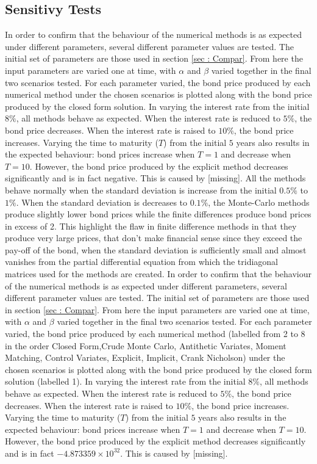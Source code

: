 \documentclass[12pt,a4paper]{article}
\begin{document}
\subsection{Sensitivy Tests}
In order to confirm that the behaviour of the numerical methods is as expected under different parameters, several different parameter values are tested. The initial set of parameters are those used in section \ref{sec : Compar}. From here the input parameters are varied one at time, with $\alpha$ and $\beta$ varied together in the final two scenarios tested. For each parameter varied, the bond price produced by each numerical method under the chosen scenarios is plotted along with the bond price produced by the closed form solution.
In varying the interest rate from the initial $8\%$, all methods behave as expected. When the interest rate is reduced to $5\%$, the bond price decreases. When the interest rate is raised to $10\%$, the bond price increases.	Varying the time to maturity ($T$) from the initial $5$ years also results in the expected behaviour: bond prices increase when $T=1$ and decrease when $T=10$. However, the bond price produced by the explicit method decreases significantly and is in fact negative. This is caused by [missing].
All the methods behave normally when the standard deviation is increase from the initial $0.5\%$ to $1\%$. When the standard deviation is decreases to $0.1\%$, the Monte-Carlo methods produce slightly lower bond prices while the finite differences produce bond prices in excess of 2. This highlight the flaw in finite difference methods in that they produce very large prices, that don't make financial sense since they exceed the pay-off of the bond, when the standard deviation is sufficiently small and almost vanishes from the partial differential equation from which the tridiagonal matrices used for the methods are created.
In order to confirm that the behaviour of the numerical methods is as expected under different parameters, several different parameter values are tested. The initial set of parameters are those used in section \ref{sec : Compar}. From here the input parameters are varied one at time, with $\alpha$ and $\beta$ varied together in the final two scenarios tested. For each parameter varied, the bond price produced by each numerical method (labelled from 2 to 8 in the order Closed Form,Crude Monte Carlo, Antithetic Variates, Moment Matching, Control Variates, Explicit, Implicit, Crank Nicholson) under the chosen scenarios is plotted along with the bond price produced by the closed form solution (labelled 1).
In varying the interest rate from the initial $8\%$, all methods behave as expected. When the interest rate is reduced to $5\%$, the bond price decreases. When the interest rate is raised to $10\%$, the bond price increases.	Varying the time to maturity ($T$) from the initial $5$ years also results in the expected behaviour: bond prices increase when $T=1$ and decrease when $T=10$. However, the bond price produced by the explicit method decreases significantly and is in fact $-4.873359\times10^{32}$. This is caused by [missing].
\end{document}
